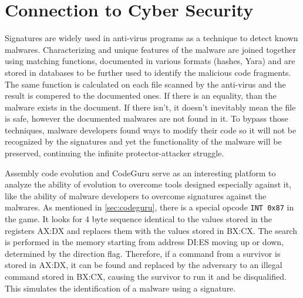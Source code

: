 \documentclass[dvipsnames, format=sigconf]{acmart}
\begin{document}
  

\section{Connection to Cyber Security}
Signatures are widely used in anti-virus programs as a technique to detect known malwares. Characterizing and unique features of the malware are joined together using matching functions, documented in various formats (\eg hashes, Yara) and are stored in databases to be further used to identify the malicious code fragments. The same function is calculated on each file scanned by the anti-virus and the result is compered to the documented ones. If there is an equality, than the malware exists in the document. If there isn't, it doesn't inevitably mean the file is safe, however the documented malwares are not found in it.  
To bypass those techniques, malware developers found ways to modify their code so it will not be recognized by the signatures and yet the functionality of the malware will be preserved, continuing the infinite protector-attacker struggle.

Assembly code evolution and CodeGuru serve as an interesting platform to analyze the ability of evolution to overcome tools designed especially against it, like the ability of malware developers to overcome signatures against the malwares.
As mentioned in \autoref{sec:codeguru}, there is a special opcode \texttt{INT 0x87} in the game. It looks for 4 byte sequence identical to the values stored in the registers AX:DX and replaces them with the values stored in BX:CX. The search is performed in the memory starting from address DI:ES moving up or down, determined by the direction flag. Therefore, if a command from a survivor is stored in AX:DX, it can be found and replaced by the adversary to an illegal command stored in BX:CX, causing the survivor to run it and be disqualified. This simulates the identification of a malware using a signature.
\end{document}
